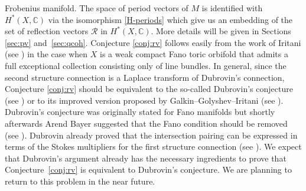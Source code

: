 \documentclass[pdftex]{sigma}
\numberwithin{equation}{section}
\newcommand{\CC}{\mathbb{C}}
\begin{document}
Frobenius manifold. The space of period vectors of $M$ is identified with
$H^*(X,\CC)$ via the isomorphism \eqref{H-periods} which give us an
embedding of the set of reflection vectors $\mathcal{R}$ in $H^*(X,\CC)$. More
details will be given in Sections \ref{sec:pv} and~\ref{sec:qcoh}. Conjecture \ref{conj:rv} follows easily from the work
of Iritani (see \cite{Iritani:gamma_structure}) in the case when $X$
is a weak compact Fano toric orbifold that admits a full exceptional
collection consisting only of line bundles. In general, since the second structure
connection is a Laplace transform of Dubrovin's connection, Conjecture
\ref{conj:rv} should be equivalent to the so-called Dubrovin's
conjecture (see \cite[Conjecture 4.2.2]{Dubrovin1998}) or to its
improved version proposed by Galkin--Golyshev--Iritani (see
\cite[Conjecture 4.6.1]{GGI2016}). Dubrovin's conjecture was
originally stated for Fano manifolds but shortly afterwards Arend
Bayer suggested that the Fano condition should be removed (see
\cite{Ba}). Dubrovin already proved that the intersection pairing can
be expressed in terms of the Stokes multipliers for the first
structure connection (see \cite[Lemma 5.4]{Dubrovin1999}). We expect
that Dubrovin's argument already has the necessary ingredients to
prove that Conjecture~\ref{conj:rv} is equivalent to Dubrovin's
conjecture. We are planning to return to this problem in the near
future.
\end{document}
